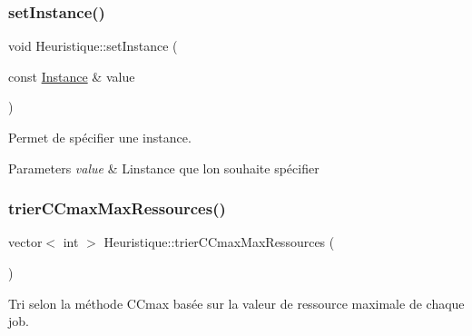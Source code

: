 \subsubsection{\texorpdfstring{set\+Instance()}{setInstance()}}
{\footnotesize\ttfamily void Heuristique\+::set\+Instance (\begin{DoxyParamCaption}\item[{const \hyperlink{classInstance}{Instance} \&}]{value }\end{DoxyParamCaption})}



Permet de spécifier une instance. 


\begin{DoxyParams}{Parameters}
{\em value} & L\textquotesingle{}instance que l\textquotesingle{}on souhaite spécifier \\
\hline
\end{DoxyParams}
\mbox{\label{classHeuristique_a1fb7501d952a428b817ad179bc2a2185}} 
\subsubsection{\texorpdfstring{trier\+C\+Cmax\+Max\+Ressources()}{trierCCmaxMaxRessources()}}
{\footnotesize\ttfamily vector$<$ int $>$ Heuristique\+::trier\+C\+Cmax\+Max\+Ressources (\begin{DoxyParamCaption}{ }\end{DoxyParamCaption})}



Tri selon la méthode C\+Cmax basée sur la valeur de ressource maximale de chaque job. 

